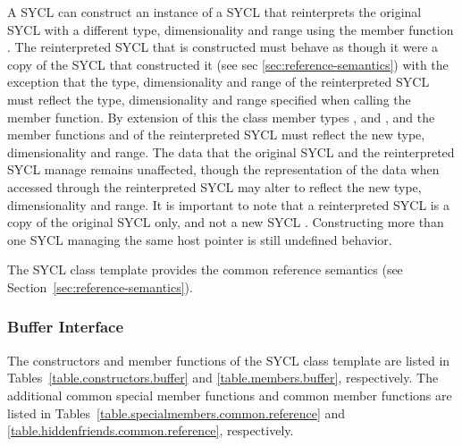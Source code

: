 A SYCL  can construct an instance of a SYCL 
that reinterprets the original SYCL  with a different
type, dimensionality and range using the member function
. The reinterpreted SYCL  that is
constructed must behave as though it were a copy of the SYCL 
that constructed it (see sec \ref{sec:reference-semantics}) with the exception
that the type, dimensionality and range of the reinterpreted SYCL
 must reflect the type, dimensionality and range specified
when calling the  member function. By extension of this
the class member types ,  and
, and the member functions 
and  of the reinterpreted SYCL  must
reflect the new type, dimensionality and range. The data that the original SYCL
 and the reinterpreted SYCL  manage
remains unaffected, though the representation of the data when accessed through
the reinterpreted SYCL  may alter to reflect the new type,
dimensionality and range. It is important to note that a reinterpreted SYCL
 is a copy of the original SYCL  only,
and not a new SYCL . Constructing more than one SYCL
 managing the same host pointer is still undefined behavior.

The SYCL  class template provides the common reference
semantics (see Section~\ref{sec:reference-semantics}).


\subsubsection{Buffer Interface}

The constructors and member functions of the SYCL  class template are listed in Tables~\ref{table.constructors.buffer} and \ref{table.members.buffer}, respectively. The additional common special member functions and common member functions are listed in Tables~\ref{table.specialmembers.common.reference} and \ref{table.hiddenfriends.common.reference}, respectively.

